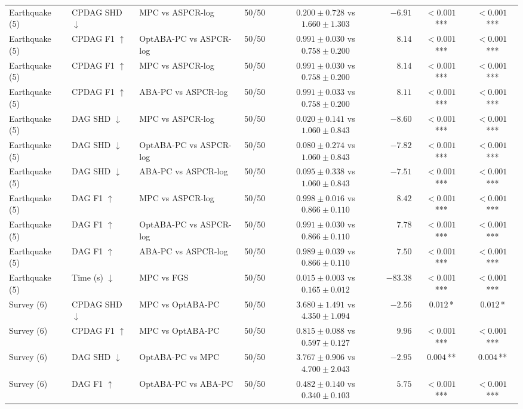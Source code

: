 \begin{table}[t]
{\begin{tabular}{lllrcrcc}
Earthquake (5) & CPDAG SHD $\downarrow$ & MPC vs ASPCR-log & 50/50 & $0.200\pm0.728$ vs $1.660\pm1.303$ & $-6.91$ & $<0.001$\,*** & $<0.001$\,***\\
Earthquake (5) & CPDAG F1 $\uparrow$ & OptABA-PC vs ASPCR-log & 50/50 & $0.991\pm0.030$ vs $0.758\pm0.200$ & $8.14$ & $<0.001$\,*** & $<0.001$\,***\\
Earthquake (5) & CPDAG F1 $\uparrow$ & MPC vs ASPCR-log & 50/50 & $0.991\pm0.030$ vs $0.758\pm0.200$ & $8.14$ & $<0.001$\,*** & $<0.001$\,***\\
Earthquake (5) & CPDAG F1 $\uparrow$ & ABA-PC vs ASPCR-log & 50/50 & $0.991\pm0.033$ vs $0.758\pm0.200$ & $8.11$ & $<0.001$\,*** & $<0.001$\,***\\
Earthquake (5) & DAG SHD $\downarrow$ & MPC vs ASPCR-log & 50/50 & $0.020\pm0.141$ vs $1.060\pm0.843$ & $-8.60$ & $<0.001$\,*** & $<0.001$\,***\\
Earthquake (5) & DAG SHD $\downarrow$ & OptABA-PC vs ASPCR-log & 50/50 & $0.080\pm0.274$ vs $1.060\pm0.843$ & $-7.82$ & $<0.001$\,*** & $<0.001$\,***\\
Earthquake (5) & DAG SHD $\downarrow$ & ABA-PC vs ASPCR-log & 50/50 & $0.095\pm0.338$ vs $1.060\pm0.843$ & $-7.51$ & $<0.001$\,*** & $<0.001$\,***\\
Earthquake (5) & DAG F1 $\uparrow$ & MPC vs ASPCR-log & 50/50 & $0.998\pm0.016$ vs $0.866\pm0.110$ & $8.42$ & $<0.001$\,*** & $<0.001$\,***\\
Earthquake (5) & DAG F1 $\uparrow$ & OptABA-PC vs ASPCR-log & 50/50 & $0.991\pm0.030$ vs $0.866\pm0.110$ & $7.78$ & $<0.001$\,*** & $<0.001$\,***\\
Earthquake (5) & DAG F1 $\uparrow$ & ABA-PC vs ASPCR-log & 50/50 & $0.989\pm0.039$ vs $0.866\pm0.110$ & $7.50$ & $<0.001$\,*** & $<0.001$\,***\\
Earthquake (5) & Time (s) $\downarrow$ & MPC vs FGS & 50/50 & $0.015\pm0.003$ vs $0.165\pm0.012$ & $-83.38$ & $<0.001$\,*** & $<0.001$\,***\\
Survey (6) & CPDAG SHD $\downarrow$ & MPC vs OptABA-PC & 50/50 & $3.680\pm1.491$ vs $4.350\pm1.094$ & $-2.56$ & $0.012$\,* & $0.012$\,*\\
Survey (6) & CPDAG F1 $\uparrow$ & MPC vs OptABA-PC & 50/50 & $0.815\pm0.088$ vs $0.597\pm0.127$ & $9.96$ & $<0.001$\,*** & $<0.001$\,***\\
Survey (6) & DAG SHD $\downarrow$ & OptABA-PC vs MPC & 50/50 & $3.767\pm0.906$ vs $4.700\pm2.043$ & $-2.95$ & $0.004$\,** & $0.004$\,**\\
Survey (6) & DAG F1 $\uparrow$ & OptABA-PC vs ABA-PC & 50/50 & $0.482\pm0.140$ vs $0.340\pm0.103$ & $5.75$ & $<0.001$\,*** & $<0.001$\,***\\

\end{tabular}}
\end{table}
